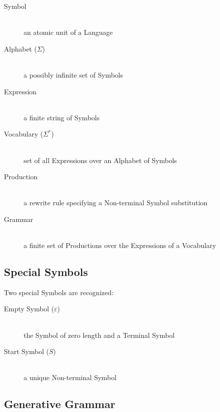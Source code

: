 \documentclass{article}
\begin{document}
\begin{description}

    \item[Symbol] \hfill \\
    an atomic unit of a Language

    \item[Alphabet ($\Sigma$)] \hfill \\
    a possibly infinite set of Symbols

    \item[Expression] \hfill \\
    a finite string of Symbols

    \item[Vocabulary ($\Sigma^{*}$)] \hfill \\
    set of all Expressions over an Alphabet of Symbols

    \item[Production] \hfill \\
    a rewrite rule specifying a Non-terminal Symbol substitution

    \item[Grammar] \hfill \\
    a finite set of Productions over the Expressions of a Vocabulary

\end{description}

\subsection{Special Symbols}

Two special Symbols are recognized:

    \begin{description}

    \item[Empty Symbol ($\varepsilon$)] \hfill \\
    the Symbol of zero length and a Terminal Symbol

    \item[Start Symbol ($S$)] \hfill \\
    a unique Non-terminal Symbol

    \end{description}

\subsection{Generative Grammar}
\end{document}
